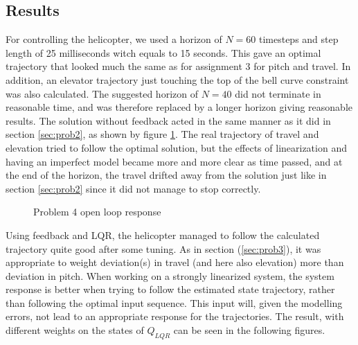 \subsection{Results}
For controlling the helicopter, we used a horizon of $N=60$ timesteps and step length of 25 milliseconds witch equals to 15 seconds. This gave an optimal trajectory that looked much the same as for assignment 3 for pitch and travel. In addition, an elevator trajectory just touching the top of the bell curve constraint was also calculated. The suggested horizon of $N=40$ did not terminate in reasonable time, and was therefore replaced by a longer horizon giving reasonable results. The solution without feedback acted in the same manner as it did in section \ref{sec:prob2}, as shown by figure \ref{fig:day4_ol}. The real trajectory of travel and elevation tried to follow the optimal solution, but the effects of linearization and having an imperfect model became more and more clear as time passed, and at the end of the horizon, the travel drifted away from the solution just like in section \ref{sec:prob2} since it did not manage to stop correctly.

\begin{figure}[htb]
    \centering
    \caption{Problem 4 open loop response}
    \label{fig:day4_ol}
\end{figure}

Using feedback and LQR, the helicopter managed to follow the calculated trajectory quite good after some tuning. As in section (\ref{sec:prob3}), it was appropriate to weight deviation(s) in travel (and here also elevation) more than deviation in pitch.
When working on a strongly linearized system, the system response is better when trying to follow the estimated state trajectory, rather than following the optimal input sequence. This input will, given the modelling errors, not lead to an appropriate response for the trajectories. The result, with different weights on the states of $Q_{LQR}$ can be seen in the following figures.

